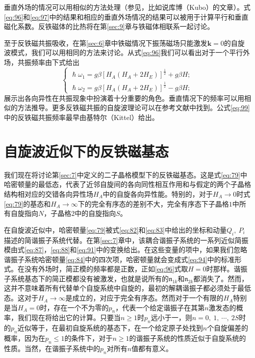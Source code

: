 \documentclass{article}
\begin{document}
垂直外场的情况可以用相似的方法处理（参见，比如说库博（Kubo）的文章）。式\eqref{eq:96}和\eqref{eq:97}中的结果和相应的垂直外场情况的结果可以被用于计算平行和垂直磁化系数。反铁磁体的比热将在第\ref{sec:9}章与铁磁体相联系一起讨论。

至于反铁磁共振吸收，在第\ref{sec:6}章中铁磁情况下振荡磁场只能激发$\mathbf{k}=0$的自旋波模式，我们可以用相同的方法来讨论。从式\eqref{eq:96}我们可以看出对于一个平行外场，共振频率由下式给出
\begin{equation} \label{eq:99}
\left\{
\begin{array}{l}
\hslash\omega_1=g\beta[H_A(H_A+2H_E)]^\frac{1}{2}+g\beta H;\\
\hslash\omega_2=g\beta[H_A(H_A+2H_E)]^\frac{1}{2}-g\beta H;
\end{array}
\right.
\end{equation}
展示出各向异性在共振现象中扮演着十分重要的角色。垂直情况下的频率可以用相似的方法推导。更多反铁磁共振的自旋波理论可以在参考文献中找到。公式\eqref{eq:99}中的反铁磁共振频率最早由基特尔（Kittel）给出。




\section{自旋波近似下的反铁磁基态} \label{sec:8}

我们现在将讨论第\ref{sec:7}中定义的二子晶格模型下的反铁磁基态。这是式\eqref{eq:79}中哈密顿量的最低态，代表了近邻自旋间的各向同性相互作用和与假定的两个子晶格结构相对应的交错各向异性场$H_A$中的自旋各向异性能。特别的，对于$H_A\rightarrow 0$时式\eqref{eq:79}的基态和$H_A\rightarrow\infty$下的完全有序态的差别不大，完全有序态下子晶格$1$中所有自旋指向$N$，子晶格$2$中的自旋指向$S$。

在自旋波近似中，哈密顿量\eqref{eq:79}被式\eqref{eq:82}和\eqref{eq:83}中给出的坐标和动量$Q_i,~P_i$描述的简谐振子系统代替。在第\ref{sec:7}章中，该耦合谐振子系统的一系列近似简振模由式\eqref{eq:87}，\eqref{eq:88}和\eqref{eq:91}中的变换给出。在这些变量的项中，如果我们忽略谐振子系统哈密顿量\eqref{eq:84}中的四次项，哈密顿量就会变成式\eqref{eq:94}中的标准形式。在没有外场时，简正模的频率都是正数，正如\eqref{eq:96}式取$H=0$时那样。谐振子系统基态下的简正模都没有被激发，也就是说所有的$\mathfrak{n}_{1k}$和$\mathfrak{n}_{2k}$都消失了。然而，这并不意味着所有代替单个自旋系统中自旋的，最初的解耦谐振子都必须处于最低态。这对于$H_A\rightarrow\infty$是成立的，对应于完全有序态。然而对于一个有限的$H_A$特别是当$H_A=0$时，存在一个不为零的$p_n$，代表一个给定谐振子在其第$n$激发态的概率，我们现在将给出它的计算。只要当$n\geqslant 1$时$p_n$远小于一，则$n=0,~1,~\cdots,~2S$时的$p_n$近似等于，在最初自旋系统的基态下，在一个给定原子处找到$n$个自旋偏差的概率，因为在$p_n\leqslant 1$的条件下，对于$n\geqslant 1$的谐振子系统的性质近似于自旋系统的性质。当然，在谐振子系统中的$p_n$对所有$n$值都有意义。
\end{document}
